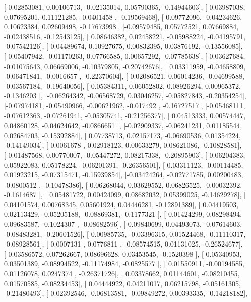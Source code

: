 \documentclass{article}
\begin{document}
       [-0.02853081,  0.00106713, -0.02135014,  0.05790365, -0.14944603],
       [ 0.03987038,  0.07695201,  0.11121285, -0.0401458 , -0.19569468],
       [-0.09772096, -0.04234626,  0.10623384,  0.02609498, -0.17673998],
       [-0.09579485,  0.05772521,  0.07669884, -0.02438516, -0.12543125],
       [ 0.08646382,  0.02458221, -0.05988224, -0.04195791, -0.07542126],
       [-0.04489674,  0.10927675,  0.00832395,  0.03876192, -0.13556085],
       [-0.05407942, -0.01170263,  0.07766585,  0.00657292, -0.07785638],
       [-0.03627684, -0.01075643,  0.06669006, -0.10379805, -0.20742676],
       [ 0.03311959, -0.04658809, -0.06471841, -0.0016657 , -0.22370604],
       [ 0.02086521,  0.06014236, -0.04699588, -0.03567184, -0.19640056],
       [-0.05384311,  0.06052802,  0.08926294,  0.00965372, -0.1346203 ],
       [-0.06264342, -0.06568729,  0.03046257, -0.05827843, -0.20354254],
       [-0.07974181, -0.05490966, -0.00621962, -0.017492  , -0.16727517],
       [-0.05468111, -0.07612363, -0.07261941, -0.05305741, -0.21256377],
       [ 0.04513333,  0.00574447,  0.04860128, -0.04624642, -0.0866651 ],
       [-0.02909337, -0.06241231,  0.01185544,  0.02684703, -0.15392884],
       [ 0.07738713,  0.02157173, -0.06690536,  0.01354224, -0.14149034],
       [-0.0061678 ,  0.02918123,  0.00633279,  0.08621086, -0.10828581],
       [-0.01487568,  0.00770007, -0.05447272,  0.08217338, -0.20895903],
       [-0.06204383,  0.05922083,  0.05178224, -0.06201391, -0.26356501],
       [ 0.03311123, -0.00114485,  0.01923215, -0.07315471, -0.15939854],
       [-0.03424264, -0.02771785,  0.00200483, -0.0800512 , -0.10478386],
       [ 0.06268044,  0.03629552,  0.06826525, -0.00032392, -0.1614687 ],
       [ 0.05481722,  0.00424099,  0.08682032,  0.05399025, -0.14629278],
       [ 0.04101574,  0.00768345,  0.05601924,  0.04446281, -0.12891389],
       [ 0.04419503,  0.02113429, -0.05205188, -0.08869381, -0.1177321 ],
       [ 0.01424299,  0.08298494,  0.09683587, -0.1024307 , -0.08682596],
       [-0.09840699,  0.04493073, -0.07614603, -0.08483281, -0.20601526],
       [-0.00985735, -0.03396315,  0.01524468, -0.11110317, -0.08928561],
       [ 0.0007131 ,  0.0776811 , -0.08574515,  0.01131025, -0.26524677],
       [-0.03586572,  0.07262667,  0.08696628,  0.03453545, -0.1520398 ],
       [ 0.05340953,  0.03501389, -0.08994522, -0.11174984, -0.0825577 ],
       [ 0.01550911, -0.00194585,  0.01126078,  0.0247374 , -0.26371726],
       [ 0.03378662,  0.01144601, -0.08210455,  0.01570585, -0.08234453],
       [ 0.04444922,  0.04211017,  0.06215798, -0.05161305, -0.21480493],
       [-0.02392546, -0.06813581, -0.09849272,  0.00393335, -0.14218182],
\end{document}
